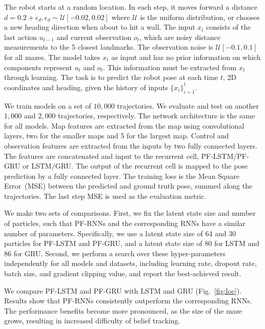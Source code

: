 \documentclass[letterpaper]{article} %
\begin{document}
The robot starts at a random location. In each step, it moves forward a distance $d = 0.2 + \epsilon_d, \epsilon_d\sim \mathcal{U}[-0.02, 0.02]$ where $\mathcal{U}$ is the uniform distribution, or chooses a new heading direction when about to hit a wall. The input $x_t$ consists of the last action $u_{t-1}$ and current observation $o_t$, which are noisy distance measurements to the 5 closest landmarks. The observation noise is $\mathcal{U}[-0.1, 0.1]$ for all mazes. The model takes $x_t$ as input and has no prior information on which components represent $u_t$ and $o_t$.  This information must be extracted from $x_t$ through learning. The task is to predict the robot pose at each time $t$, 2D coordinates and heading, given the history of inputs $\{x_i\}_{i=1}^t$.

We train models on a set of $10,000$ trajectories. We evaluate and test on another $1,000$ and $2,000$ trajectories, respectively.
The network architecture is the same for all models. Map features are extracted from the map using convolutional layers, two for the smaller maps and 5 for the largest map. Control and observation features are extracted from the inputs by two fully connected layers. The features are concatenated and input to the recurrent cell, PF-LSTM/PF-GRU or LSTM/GRU. The output of the recurrent cell is mapped to the pose prediction by a fully connected layer.
The training loss is the Mean Square Error~(MSE) between the predicted and ground truth pose, summed along the trajectories. The last step MSE is used as the evaluation metric. 

We make two sets of comparisons. First, we fix the latent state size and number of particles, such that PF-RNNs and the corresponding RNNs have a similar number of parameters. Specifically, we use a latent state size of 64 and 30 particles for PF-LSTM and PF-GRU, and a latent state size of 80 for LSTM and 86 for GRU. Second, we perform a search over these hyper-parameters independently for all models and datasets, including learning rate, dropout rate, batch size, and gradient clipping value, and report the best-achieved result. %

We compare PF-LSTM and PF-GRU with LSTM and GRU (Fig.~\ref{fig:loc}). 
Results show that PF-RNNs consistently outperform the corresponding RNNs. The performance benefits become more pronounced, as the size of the maze grows, resulting in increased difficulty of belief tracking.
\end{document}

